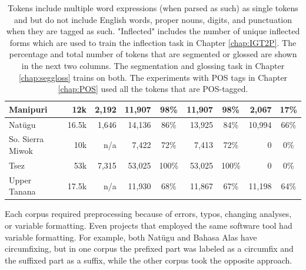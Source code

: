 \begin{table}[tb]
\begin{tabular}{l|r|r|rc|rc|rc}
         \hline
         Manipuri & 12k  & 2,192 & 11,907 & 98\%  & 11,907 & 98\% & 2,067 & 17\% \\
         \hline
         Natügu & 16.5k & 1,646 & 14,136 & 86\%  & 13,925 &  84\% & 10,994 & 66\% \\
         \hline
         So. Sierra Miwok & 10k  & n/a & 7,422 & 72\% & 7,413 & 72\% & 0  & 0\% \\
         \hline
         Tsez & 53k & 7,315 & 53,025 & 100\% & 53,025 & 100\% & 0  & 0\%  \\
         \hline
         Upper Tanana & 17.5k & n/a & 11,930 & 68\% & 11,867 & 67\% & 11,198 & 64\% 
    \end{tabular}
    \caption[Data Statistics]{Tokens include multiple word expressions (when parsed as such) as single tokens and but do not include English words, proper nouns, digits, and punctuation when they are tagged as such. "Inflected" includes the number of unique inflected forms which are used to train the inflection task in Chapter \ref{chap:IGT2P}. The percentage and total number of tokens that are segmented or glossed are shown in the next two columns. The segmentation and glossing task in Chapter \ref{chap:seggloss} trains on both. The experiments with POS tags in Chapter \ref{chap:POS} used all the tokens that are POS-tagged.}
    \label{tab:dissdata}
\end{table}

Each corpus required preprocessing because of errors, typos, changing analyses, or variable formatting. Even projects that employed the same software tool had variable formatting. For example, both Nat\"ugu and Bahasa Alas have circumfixing, but in one corpus the prefixed part was labeled as a circumfix and the suffixed part as a suffix, while the other corpus took the opposite approach. 

